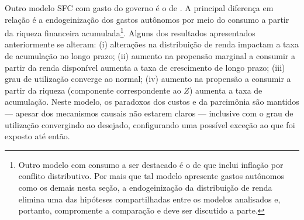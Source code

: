 Outro modelo SFC com gasto do governo é o de \textcite{brochier_supermultiplier_2018}.
A principal diferença em relação é a endogeinização dos gastos autônomos por meio do consumo a partir da riqueza financeira acumulada\footnote{
	Outro modelo com consumo a ser destacado é o de \textcite{nah_role_2019} %
	que inclui inflação por conflito distributivo. Por mais que tal modelo apresente gastos autônomos como os demais nesta seção, a endogeinização da distribuição de renda elimina uma das hipóteses compartilhadas entre os modelos analisados e, portanto, compromente a comparação e deve ser discutido a parte.
}. 
Alguns dos resultados apresentados anteriormente se alteram: 
	(i) alterações na distribuição de renda impactam a taxa de acumulação no longo prazo; 
	(ii) aumento na propensão marginal a consumir a partir da renda disponível aumenta a taxa de crescimento de longo prazo; 
	(iii) grau de utilização converge ao normal; 
	(iv) aumento na propensão a consumir a partir da riqueza (componente correspondente ao $Z$) aumenta a taxa de acumulação. 
	Neste modelo, os paradoxos dos custos e da parcimônia são mantidos --- apesar dos mecanismos causais não estarem claros --- inclusive com o grau de utilização convergindo ao desejado, configurando uma possível exceção ao que foi exposto até então.





